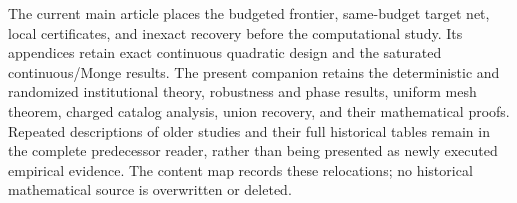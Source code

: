 The current main article places the budgeted frontier, same-budget target net, local certificates, and inexact recovery before the computational study. Its appendices retain exact continuous quadratic design and the saturated continuous/Monge results. The present companion retains the deterministic and randomized institutional theory, robustness and phase results, uniform mesh theorem, charged catalog analysis, union recovery, and their mathematical proofs. Repeated descriptions of older studies and their full historical tables remain in the complete predecessor reader, rather than being presented as newly executed empirical evidence. The content map records these relocations; no historical mathematical source is overwritten or deleted.
